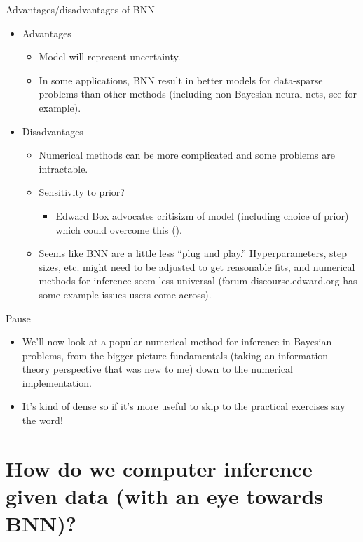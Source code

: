 \documentclass{beamer}
\begin{document}
\begin{frame}{Advantages/disadvantages of BNN}
  \begin{itemize}
  \item Advantages
    \begin{itemize}
    \item Model will represent uncertainty.
    \item In some applications, BNN result in better models for data-sparse problems than other methods (including non-Bayesian neural nets, see \cite{xiong2011} for example).
    \end{itemize}
  \item Disadvantages
    \begin{itemize}
    \item Numerical methods can be more complicated and some problems are intractable.
    \item Sensitivity to prior?
      \begin{itemize}
      \item Edward Box advocates critisizm of model (including choice of prior) which could overcome this (\cite{box1982}).
      \end{itemize}
      \item Seems like BNN are a little less ``plug and play.'' Hyperparameters, step sizes, etc. might need to be adjusted to get reasonable fits, and numerical methods for inference seem less universal (forum discourse.edward.org has some example issues users come across).
    \end{itemize}
  \end{itemize}
\end{frame}

\begin{frame}{Pause}
  \begin{itemize}
  \item We'll now look at a popular numerical method for inference in Bayesian problems, from the bigger picture fundamentals (taking an information theory perspective that was new to me) down to the numerical implementation.
  \item It's kind of dense so if it's more useful to skip to the practical exercises say the word!
  \end{itemize}
\end{frame}

\section{How do we computer inference given data (with an eye towards BNN)?}
\end{document}
